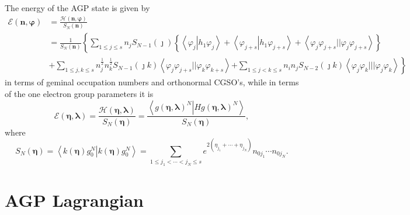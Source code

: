 \documentclass[aps,preprint]{revtex4}%
\begin{document}
The energy of the AGP state is given by \emph{ }
\begin{align}
\mathcal{E}\left(  \mathbf{n,\varphi}\right)   &  =\frac{\mathcal{H}\left(
\mathbf{n,\varphi}\right)  }{S_{N}\left(  \mathbf{n}\right)  }\nonumber\\
&  =\frac{1}{S_{N}\left(  \mathbf{n}\right)  }\left\{  \sum_{1\leq j\leq
s}n_{j}S_{N-1}\left(  \jmath\right)  \left\{  \left\langle \varphi
_{j}\left\vert h_{1}\varphi_{j}\right.  \right\rangle +\left\langle
\varphi_{j+s}\left\vert h_{1}\varphi_{j+s}\right.  \right\rangle +\left\langle
\varphi_{j}\varphi_{j+s}||\varphi_{j}\varphi_{j+s}\right\rangle \right\}
\right. \nonumber\\
&  +\sum_{1\leq j,k\leq s}n_{j}^{\frac{1}{2}}n_{k}^{\frac{1}{2}}S_{N-1}\left(
\jmath k\right)  \left\langle \varphi_{j}\varphi_{j+s}||\varphi_{k}%
\varphi_{k+s}\right\rangle \left.  +\sum_{1\leq j<k\leq s}n_{i}n_{j}%
S_{N-2}\left(  \jmath k\right)  \left\langle \varphi_{j}\varphi_{k}%
|||\varphi_{j}\varphi_{k}\right\rangle \right\}  \label{energy}%
\end{align}
in terms of geminal occupation numbers and orthonormal CGSO's, while in terms
of the one electron group parameters it is
\begin{equation}
\mathcal{E}\left(  \mathbf{\eta},\mathbf{\lambda}\right)  =\frac
{\mathcal{H}\left(  \mathbf{\eta},\mathbf{\lambda}\right)  }{S_{N}\left(
\mathbf{\eta}\right)  }=\frac{\left\langle \left.  g\left(  \mathbf{\eta
},\mathbf{\lambda}\right)  ^{N}\right\vert Hg\left(  \mathbf{\eta
},\mathbf{\lambda}\right)  ^{N}\right\rangle }{S_{N}\left(  \mathbf{\eta
}\right)  }, \label{gp_funct}%
\end{equation}
where%
\begin{equation}
S_{N}\left(  \mathbf{\eta}\right)  =\left\langle \left.  k\left(
\mathbf{\eta}\right)  g_{0}^{N}\right\vert k\left(  \mathbf{\eta}\right)
g_{0}^{N}\right\rangle =\sum_{1\leq j_{1}<\cdots<j_{N}\leq s}e^{2\left(
\eta_{j_{1}}+\cdots+\eta_{j_{N}}\right)  }n_{0j_{1}}\cdots n_{0j_{N}}.
\end{equation}


\section{\bigskip AGP Lagrangian\label{Lagran}}
\end{document}
